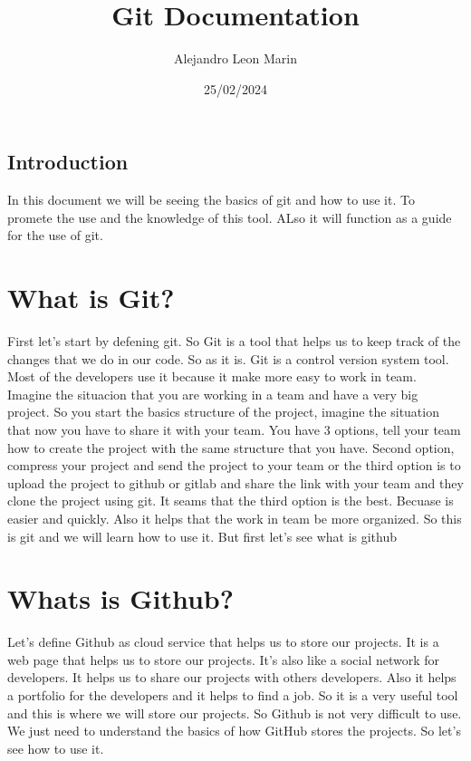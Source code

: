 \documentclass{article}
\title{Git Documentation}
\author{Alejandro Leon Marin}
\date{25/02/2024}
\begin{document}
\newpage
\maketitle
\begin{center}
\section*{Introduction}
In this document we will be seeing the basics of git and how to use it.
To promete the use and the knowledge of this tool. ALso it will function 
as a guide for the use of git. 
\end{center}
\newpage
\section*{What is Git?}

First let's start by defening git. So Git is a tool that helps us 
to keep track of the changes that we do in our code. So as it is. Git is a 
control version system tool. Most of the developers use it because it make more 
easy to work in team. Imagine the situacion that you are working in a team and have 
a very big project. So you start the basics structure of the project, imagine the situation that 
now you have to share it with your team. You have 3 options, tell your team how to create the project 
with the same structure that you have. Second option, compress your project and send the project to your team 
or the third option is to upload the project to github or gitlab and share the link with your team and they 
clone the project using git. It seams that the third option is the best. Becuase is easier and quickly. Also it helps 
that the work in team be more organized. So this is git and we will learn how to use it. But first let's see what is github 

\section*{Whats is Github?}
Let's define Github as cloud service that helps us to store our projects. It is a web page that helps us 
to store our projects. It's also like a social network for developers. It helps us to share our projects with others 
developers. Also it helps a portfolio for the developers and it helps to find a job. So it is a very useful tool and this is 
where we will store our projects. So Github is not very difficult to use. We just need to understand the basics of how GitHub 
stores the projects. So let's see how to use it.
\end{document}
